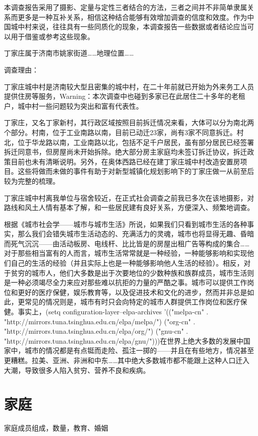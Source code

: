 本调查报告采用了摄影、定量与定性三者结合的方法，三者之间并不非简单隶属关系而更多是一种互补关系，相信这种结合能够有效增加调查的信度和效度。作为中国城中村来说，往往具有一些同质化的现象，本调查报告一些数据或者结论应当可以用于借鉴或参考这些现象。

丁家庄属于济南市姚家街道……地理位置……

调查理由：

丁家庄城中村是济南较大型且密集的城中村，在二十年前就已开始为外来务工人员提供住房等服务，Warning：本次调查中也碰到多家已在此居住二十多年的老租户，城中村一些问题较为突出和富有代表性。

丁家庄，又名丁家新村，其行政区域按照目前拆迁情况来看，大体可以分为南北两个部分。村南，位于工业南路以南，目前已动迁23家，尚有3家不同意拆迁。村北，位于华龙路以南，工业南路以北，包括不足千户居民，虽有部分居民已经签署拆迁同意书，但房屋尚未开始拆除。绝大部分房主家庭均未签订拆迁协议，拆迁政策目前也未有清晰说明。另外，在奥体西路已经在建丁家庄城中村改造安置房项目。这些将做而未做的事件有助于对新型城镇化规划影响下的丁家庄做一从前至后较为完整的梳理。

丁家庄城中村离我单位与宿舍较近，在正式社会调查之前我已多次在该地摄影，对路线和风土人情有基本了解，和一些居民建有良好关系，方便深入、频繁地调查。

根据《城市社会学——城市与城市生活》所说，如果我们只看到城市生活的各种事实，那么我们会错失城市生活动态的、充满活力的灵魂，城市也将显得无趣、昏暗而死气沉沉——由活动板房、电线杆、比比皆是的房屋出租广告等构成的集合…… 对于那些相当富有的人而言，城市生活常常就是一种经验，一种能够影响和实现他们自己的生活的经验（并且实际上也是一种能够影响他人生活的经验）。相反，对于贫穷的城市人，他们大多数是出于次要地位的少数种族和族群成员，城市生活则是一种必须竭尽全力来应对那些难以抗拒的力量的严酷之事。城市可以提供工作岗位和更好的医疗保健，娱乐教育等，以及促进技术和文化的进步，然而并非总是如此，更常见的情况则是，城市有时只会向特定的城市人群提供工作岗位和医疗保健。事实上，(setq configuration-layer--elpa-archives '(("melpa-cn" . "http://mirrors.tuna.tsinghua.edu.cn/elpa/melpa/") ("org-cn" . "http://mirrors.tuna.tsinghua.edu.cn/elpa/org/") ("gnu-cn" . "http://mirrors.tuna.tsinghua.edu.cn/elpa/gnu/")))在世界上绝大多数的发展中国家中，城市的情况都是有点铤而走险、孤注一掷的——并且在有些地方，情况甚至更糟糕。拉美、亚洲、非洲和中东……其中绝大多数城市都不能跟上这种人口迁入大潮，导致很多人陷入贫穷、营养不良和疾病。

\section{家庭}家庭成员组成，数量，教育、婚姻

